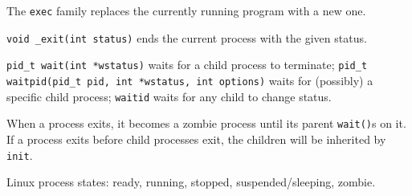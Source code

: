 \documentclass[10pt]{slnotes}
\begin{document}
The \texttt{exec} family replaces the currently running program with a new one.

\texttt{void \_exit(int status)} ends the current process with the given status.

\texttt{pid\_t wait(int *wstatus)} waits for a child process to terminate; \texttt{pid\_t waitpid(pid\_t pid, int *wstatus, int options)} waits for (possibly) a specific child process; \texttt{waitid} waits for any child to change status.

When a process exits, it becomes a zombie process until its parent \texttt{wait()}s on it. If a process exits before child processes exit, the children will be inherited by \texttt{init}.

Linux process states: ready, running, stopped, suspended/sleeping, zombie.
\end{document}

